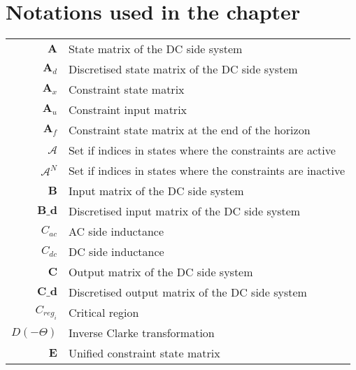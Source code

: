 \newpage
\section{Notations used in the chapter}
		
  \begin{scriptsize}
\begin{tabularx}{\textwidth}{r|X}
  
  $\textbf{A}$                  & State matrix of the DC side system\\
  $\textbf{A}_d$                & Discretised state matrix of the DC side system\\
  $\textbf{A}_x$              & Constraint state matrix\\
  $\textbf{A}_u$              & Constraint input matrix\\
  $\textbf{A}_f$              & Constraint state matrix at the end of the horizon\\
  $\mathcal{A}$               & Set if indices in states where the constraints are active\\
  $\mathcal{A}^N$               & Set if indices in states where the constraints are inactive\\
  
  $\textbf{B}$                  & Input matrix of the DC side system\\
  $\textbf{B_d}$                & Discretised input matrix of the DC side system\\
  
  $C_{ac}$                          & AC side inductance\\
  $C_{dc}$                          & DC side inductance\\
  $\textbf{C}$                  & Output matrix of the DC side system\\
  $\textbf{C_d}$                & Discretised output matrix of the DC side system\\
  $C_{reg_i}$                       & Critical region\\
  
  $D(-\Theta)$                      & Inverse Clarke transformation\\
  
  $\textbf{E}$                & Unified constraint state matrix \\
  

\end{tabularx}
\end{scriptsize}
